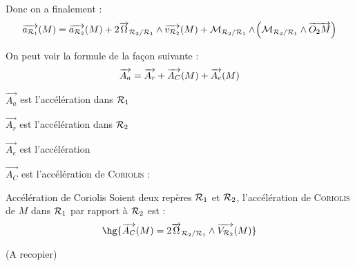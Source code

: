 \documentclass[a4paper,french,bookmarks]{book}
\begin{document}
    Donc on a finalement :
    \[ \overrightarrow{a_{\mathcal{R}_1}}\!\left(M\right) = \overrightarrow{a_{\mathcal{R}_2}}\!\left(M\right) + 2\overrightarrow{\Omega}_{\mathcal{R}_2/\mathcal{R}_1} \wedge \overrightarrow{v_{\mathcal{R}_2}}\!\left(M\right) +  \mathcal{M}_{\mathcal{R}_2/\mathcal{R}_1} \wedge \!\left( \mathcal{M}_{\mathcal{R}_2/\mathcal{R}_1} \wedge \overrightarrow{O_2M}\right)\]
    
    On peut voir la formule de la façon suivante :
    \[ \overrightarrow{A_a} = \overrightarrow{A_r} + \overrightarrow{A_C}\!\left(M\right) + \overrightarrow{A_e}\!\left(M\right)\]
    \begin{enumerate}
        \itt $\vec{A_a}$ est l'accélération  dans $\mathcal{R}_1$
        
        \itt $\vec{A_r}$ est l'accélération  dans $\mathcal{R}_2$
        
        \itt $\vec{A_e}$ est l'accélération 
        
        \itt $\vec{A_C}$ est l'accélération de \textsc{Coriolis} :
    \end{enumerate}
    
    \begin{definition}{Accélération de Coriolis}{}
        Soient deux repères $\mathcal{R}_1$ et $\mathcal{R}_2$, l'accélération de \textsc{Coriolis} de $M$ dans $\mathcal{R}_1$ par rapport à $\mathcal{R}_2$ est :
        \[ \hg{\vec{A_C}\p{M} = 2\vec \Omega_{\bcR_2/\bcR_1} \wedge \vec{V_{\bcR_2}}\p{M}}\]
    \end{definition}
    
    (A recopier)
    
    \newpage
    
\end{document}

